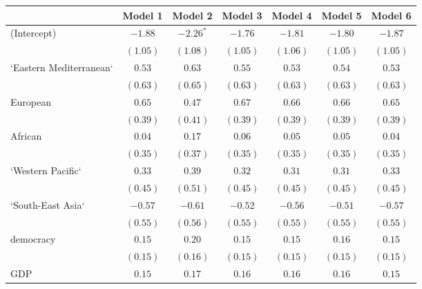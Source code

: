 
\begin{table}[!h]
\begin{center}
\begin{tabular}{l c c c c c c }
\toprule
 & Model 1 & Model 2 & Model 3 & Model 4 & Model 5 & Model 6 \\
\midrule
(Intercept)             & $-1.88$      & $-2.26^{*}$  & $-1.76$      & $-1.81$      & $-1.80$      & $-1.87$      \\
                        & $(1.05)$     & $(1.08)$     & $(1.05)$     & $(1.06)$     & $(1.05)$     & $(1.05)$     \\
`Eastern Mediterranean` & $0.53$       & $0.63$       & $0.55$       & $0.53$       & $0.54$       & $0.53$       \\
                        & $(0.63)$     & $(0.65)$     & $(0.63)$     & $(0.63)$     & $(0.63)$     & $(0.63)$     \\
European                & $0.65$       & $0.47$       & $0.67$       & $0.66$       & $0.66$       & $0.65$       \\
                        & $(0.39)$     & $(0.41)$     & $(0.39)$     & $(0.39)$     & $(0.39)$     & $(0.39)$     \\
African                 & $0.04$       & $0.17$       & $0.06$       & $0.05$       & $0.05$       & $0.04$       \\
                        & $(0.35)$     & $(0.37)$     & $(0.35)$     & $(0.35)$     & $(0.35)$     & $(0.35)$     \\
`Western Pacific`       & $0.33$       & $0.39$       & $0.32$       & $0.31$       & $0.31$       & $0.33$       \\
                        & $(0.45)$     & $(0.51)$     & $(0.45)$     & $(0.45)$     & $(0.45)$     & $(0.45)$     \\
`South-East Asia`       & $-0.57$      & $-0.61$      & $-0.52$      & $-0.56$      & $-0.51$      & $-0.57$      \\
                        & $(0.55)$     & $(0.56)$     & $(0.55)$     & $(0.55)$     & $(0.55)$     & $(0.55)$     \\
democracy               & $0.15$       & $0.20$       & $0.15$       & $0.15$       & $0.16$       & $0.15$       \\
                        & $(0.15)$     & $(0.16)$     & $(0.15)$     & $(0.15)$     & $(0.15)$     & $(0.15)$     \\
GDP                     & $0.15$       & $0.17$       & $0.16$       & $0.16$       & $0.16$       & $0.15$       \\

\end{tabular}
\end{center}
\end{table}
